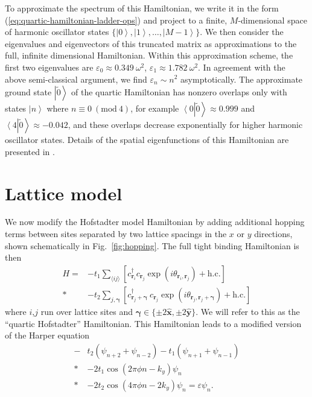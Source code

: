 \documentclass[aps,twocolumn,letterpaper,twoside,nobalancelastpage,groupedaddress,amsmath,amssymb,floatfix,citeautoscript]{revtex4-1}
\begin{document}
To approximate the spectrum of this Hamiltonian, we write it in the form (\ref{eq:quartic-hamiltonian-ladder-ops}) and project to a finite, $M$-dimensional space of harmonic oscillator states $\{\left|{0}\right>,\left|{1}\right>,\ldots,\left|{M-1}\right>\}$. We then consider the eigenvalues and eigenvectors of this truncated matrix as approximations to the full, infinite dimensional Hamiltonian. Within this approximation scheme, the first two eigenvalues are $\varepsilon_0\approx0.349~\omega^2$, $\varepsilon_1\approx1.782~\omega^2$. In agreement with the above semi-classical argument, we find $\varepsilon_n\sim n^2$ asymptotically. The approximate ground state $\left|\tilde{0}\right>$ of the quartic Hamiltonian has nonzero overlaps only with states $\left|n\right>$ where $n\equiv0~(\text{mod}~ 4)$, for example $\left<0\right.\!\!\left|\tilde{0}\right> \approx 0.999$ and $\left<4\right.\!\!\left|\tilde{0}\right> \approx -0.042$, and these overlaps decrease exponentially for higher harmonic oscillator states. Details of the spatial eigenfunctions of this Hamiltonian are presented in \cite{Haldane:2016aa}.

\section{Lattice model}
We now modify the Hofstadter model Hamiltonian by adding additional hopping terms between sites separated by two lattice spacings in the $x$ or $y$ directions, shown schematically in Fig.~\ref{fig:hopping}. The full tight binding Hamiltonian is then 
\begin{align}
\label{eq:quartic-hofstadter-hamiltonian}
H = &-t_1 \sum\limits_{\langle i j \rangle} \left[ c_{\bm{r}_i}^{\dagger} c_{\bm{r}_j} \exp\left(i\theta_{\bm{r}_i,\bm{r}_j}\right)  + \text{h.c.} \right]\nonumber \\*
&-t_2 \sum\limits_{j,\bm{\gamma}} \left[ c_{\mathbf{r}_j + \bm{\gamma}}^{\dagger}~ c_{\mathbf{r}_j}\exp\left(i\theta_{\bm{r}_j,\bm{r}_{j} +\bm{\gamma}}\right)  + \text{h.c.} \right] 
\end{align}
where $i$,$j$ run over lattice sites and $\bm{\gamma}\in\{\pm 2\hat{\mathbf{x}},\pm 2\hat{\mathbf{y}}\}$. We will refer to this as the ``quartic Hofstadter'' Hamiltonian. This Hamiltonian leads to a modified version of the Harper equation 
\begin{align}
\label{eq-harper-2}
-&t_2\left(\psi_{n+2} + \psi_{n-2}\right) - t_1\left(\psi_{n+1} + \psi_{n-1}\right)\nonumber \\*
 &-2t_1\cos(2 \pi \phi n - k_{y})\psi_n\nonumber \\*
  &-2t_2\cos\left(4 \pi \phi n - 2k_{y}\right)\psi_n = \varepsilon \psi_{n}.
\end{align}
\end{document}
